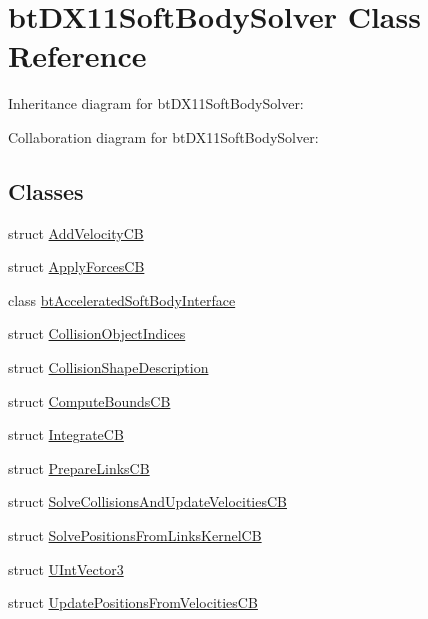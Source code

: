 \hypertarget{classbt_d_x11_soft_body_solver}{\section{bt\+D\+X11\+Soft\+Body\+Solver Class Reference}
\label{classbt_d_x11_soft_body_solver}
}


Inheritance diagram for bt\+D\+X11\+Soft\+Body\+Solver\+:


Collaboration diagram for bt\+D\+X11\+Soft\+Body\+Solver\+:
\subsection*{Classes}
\begin{DoxyCompactItemize}
\item 
struct \hyperlink{structbt_d_x11_soft_body_solver_1_1_add_velocity_c_b}{Add\+Velocity\+C\+B}
\item 
struct \hyperlink{structbt_d_x11_soft_body_solver_1_1_apply_forces_c_b}{Apply\+Forces\+C\+B}
\item 
class \hyperlink{classbt_d_x11_soft_body_solver_1_1bt_accelerated_soft_body_interface}{bt\+Accelerated\+Soft\+Body\+Interface}
\item 
struct \hyperlink{structbt_d_x11_soft_body_solver_1_1_collision_object_indices}{Collision\+Object\+Indices}
\item 
struct \hyperlink{structbt_d_x11_soft_body_solver_1_1_collision_shape_description}{Collision\+Shape\+Description}
\item 
struct \hyperlink{structbt_d_x11_soft_body_solver_1_1_compute_bounds_c_b}{Compute\+Bounds\+C\+B}
\item 
struct \hyperlink{structbt_d_x11_soft_body_solver_1_1_integrate_c_b}{Integrate\+C\+B}
\item 
struct \hyperlink{structbt_d_x11_soft_body_solver_1_1_prepare_links_c_b}{Prepare\+Links\+C\+B}
\item 
struct \hyperlink{structbt_d_x11_soft_body_solver_1_1_solve_collisions_and_update_velocities_c_b}{Solve\+Collisions\+And\+Update\+Velocities\+C\+B}
\item 
struct \hyperlink{structbt_d_x11_soft_body_solver_1_1_solve_positions_from_links_kernel_c_b}{Solve\+Positions\+From\+Links\+Kernel\+C\+B}
\item 
struct \hyperlink{structbt_d_x11_soft_body_solver_1_1_u_int_vector3}{U\+Int\+Vector3}
\item 
struct \hyperlink{structbt_d_x11_soft_body_solver_1_1_update_positions_from_velocities_c_b}{Update\+Positions\+From\+Velocities\+C\+B}

\end{DoxyCompactItemize}
